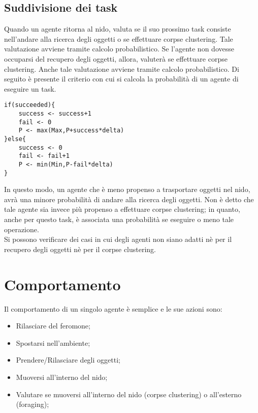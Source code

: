 \documentclass[12pt,a4paper,openright,twoside]{report}
\begin{document}
\section{Suddivisione dei task} 
Quando un agente ritorna al nido, valuta se il suo prossimo task consiste nell'andare alla ricerca degli oggetti o se effettuare corpse clustering. Tale valutazione avviene tramite calcolo probabilistico. Se l'agente non dovesse occuparsi del recupero degli oggetti, allora, valuterà se effettuare corpse clustering. Anche tale valutazione avviene tramite calcolo probabilistico. Di seguito è presente il criterio con cui si calcola la probabilità di un agente di eseguire un task.\\


\begin{verbatim}
if(succeeded){
    success <- success+1
    fail <- 0
    P <- max(Max,P+success*delta)
}else{
    success <- 0
    fail <- fail+1
    P <- min(Min,P-fail*delta)
}
\end{verbatim}

In questo modo, un agente che è meno propenso a trasportare oggetti nel nido, avrà una minore probabilità di andare alla ricerca degli oggetti. Non è detto che tale agente sia invece più propenso a effettuare corpse clustering; in quanto, anche per questo task, è associata una probabilità se eseguire o meno tale operazione.\\
Si possono verificare dei casi in cui degli agenti non siano adatti nè per il recupero degli oggetti nè per il corpse clustering.

\clearpage{\pagestyle{empty}\cleardoublepage}
\chapter{Comportamento}                %
\lhead[\fancyplain{}{\bfseries\thepage}]{\fancyplain{}{\bfseries\rightmark}}
Il comportamento di un singolo agente è semplice e le sue azioni sono:

\begin{itemize}
	\item Rilasciare del feromone;
	\item Spostarsi nell'ambiente;
	\item Prendere/Rilasciare degli oggetti;
	\item Muoversi all'interno del nido;
	\item Valutare se muoversi all'interno del nido (corpse clustering) o all'esterno (foraging);
\end{itemize}
\end{document}
